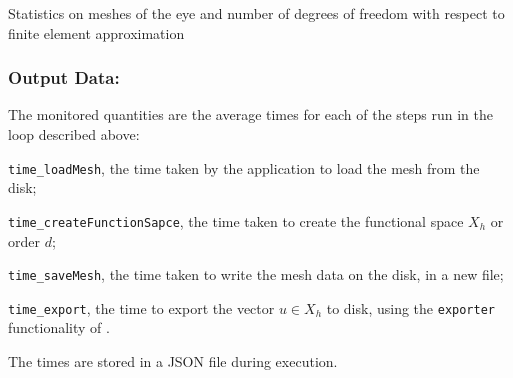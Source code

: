\begin{table}[!ht]
    \centering

  \caption{Statistics on meshes of the eye and number of degrees of freedom with respect to finite element approximation}
  \label{tab:spec:app-feelpp:eye2brain:mesh_stats}
\end{table}

\subsubsection{Output Data:}

The monitored quantities are the average times for each of the steps run in the loop described above:
\begin{inparaenum}[\it(i)]
\item \texttt{time\_loadMesh}, the time taken by the application to load the mesh from the disk;
\item \texttt{time\_createFunctionSapce}, the time taken to create the functional space $X_h$ or order $d$;
\item \texttt{time\_saveMesh}, the time taken to write the mesh data on the disk, in a new file;
\item \texttt{time\_export}, the time to export the vector $u\in X_h$ to disk, using the \texttt{exporter} functionality of \Feelpp.
\end{inparaenum}
The times are stored in a JSON file during execution.


